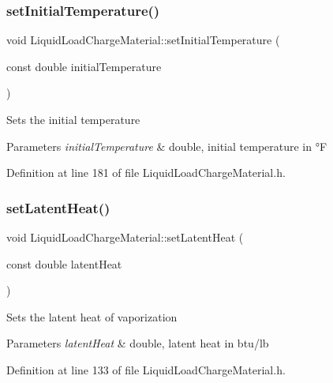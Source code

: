 \subsubsection{\texorpdfstring{set\+Initial\+Temperature()}{setInitialTemperature()}}
{\footnotesize\ttfamily void Liquid\+Load\+Charge\+Material\+::set\+Initial\+Temperature (\begin{DoxyParamCaption}\item[{const double}]{initial\+Temperature }\end{DoxyParamCaption})\hspace{0.3cm}{\ttfamily [inline]}}

Sets the initial temperature 
\begin{DoxyParams}{Parameters}
{\em initial\+Temperature} & double, initial temperature in °F \\
\hline
\end{DoxyParams}


Definition at line 181 of file Liquid\+Load\+Charge\+Material.\+h.

\mbox{\label{class_liquid_load_charge_material_a01d2d23580f27aa9e5cba1124635a677}} 
\subsubsection{\texorpdfstring{set\+Latent\+Heat()}{setLatentHeat()}}
{\footnotesize\ttfamily void Liquid\+Load\+Charge\+Material\+::set\+Latent\+Heat (\begin{DoxyParamCaption}\item[{const double}]{latent\+Heat }\end{DoxyParamCaption})\hspace{0.3cm}{\ttfamily [inline]}}

Sets the latent heat of vaporization 
\begin{DoxyParams}{Parameters}
{\em latent\+Heat} & double, latent heat in btu/lb \\
\hline
\end{DoxyParams}


Definition at line 133 of file Liquid\+Load\+Charge\+Material.\+h.

\mbox{\label{class_liquid_load_charge_material_a9984b8c78a460ef3569fc3ef13eea604}} 
